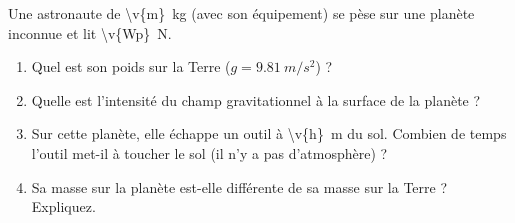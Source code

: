 Une astronaute de \qty{\v{m}}{kg} (avec son équipement) se pèse sur une planète inconnue et lit \qty{\v{Wp}}{N}.

\begin{enumerate}[label=\alph*)]
    \item Quel est son poids sur la Terre ($g = \qty{9.81}{m/s^2}$) ?
    \item Quelle est l'intensité du champ gravitationnel à la surface de la planète ?
    \item Sur cette planète, elle échappe un outil à \qty{\v{h}}{m} du sol. Combien de temps l'outil met-il à toucher le sol (il n'y a pas d'atmosphère) ?
    \item Sa masse sur la planète est-elle différente de sa masse sur la Terre ? Expliquez.
\end{enumerate}
